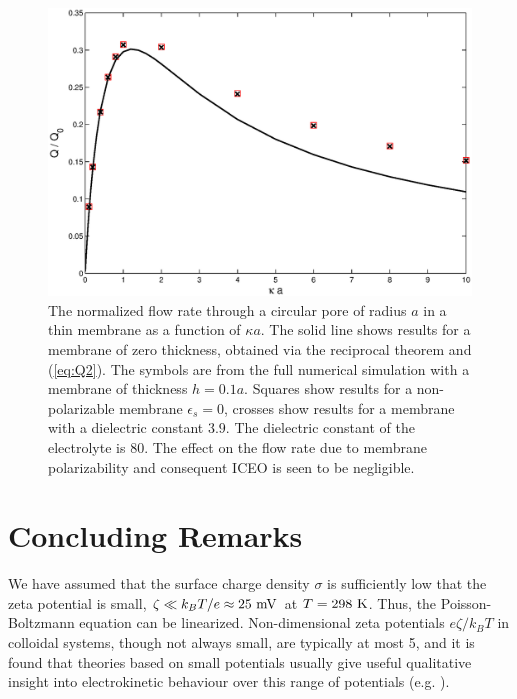 \begin{figure}[ht]
\centering
\includegraphics[width = 1.0\textwidth]{zero_thickness/figure5.eps}
\caption{The normalized flow rate through a circular pore of radius $a$ in a thin membrane 
as a function of $\kappa a$. The solid line shows results for a membrane of zero thickness,
obtained via the reciprocal theorem and (\ref{eq:Q2}).
The symbols are from the full numerical simulation with a membrane
of thickness $h = 0.1a$.
Squares show results for
 a non-polarizable membrane $\epsilon_s=0$, crosses show results for 
 a membrane with a dielectric constant $3.9$. The  dielectric constant of 
 the electrolyte is $80$. The effect on the flow rate
due to membrane polarizability and consequent ICEO
 is seen to be negligible.}
\label{fig:QaKappaEpw0}
\end{figure}

\section{Concluding Remarks}\label{sec:conclusion}
We have assumed that the surface charge density $\sigma$ is sufficiently low 
that the zeta potential is small, $\zeta\ll k_BT/e\approx 25\rm\ mV$ at $T=298\rm\ K$.
Thus, the Poisson-Boltzmann equation can be linearized.
Non-dimensional zeta potentials $e\zeta/k_BT$ in colloidal systems, though not always small, are typically at most 5, and it is found that theories based on small potentials usually give useful
qualitative insight into electrokinetic behaviour over this range of potentials (e.g. \cite{levine1975}).

